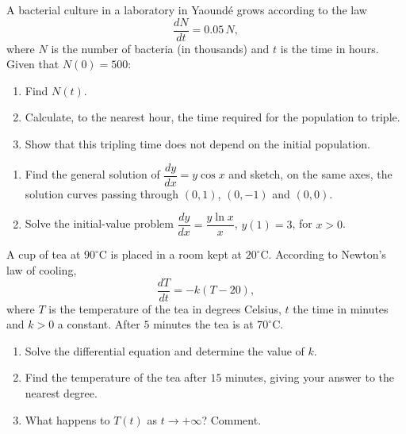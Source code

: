 \documentclass[11pt]{article}
\newcounter{popsec}
\newcounter{popsub}
\newcommand{\courssub}[1]{%
  \stepcounter{popsub}%
  \par\vspace{9pt}\noindent{\popxbold\fontsize{11.5}{13}\selectfont\color{popink}{\color{poporange}\thepopsec.\thepopsub}\hspace{6pt}#1}\par\nopagebreak\vspace{4pt}
}
\begin{document}
\begin{exercice}
A bacterial culture in a laboratory in Yaoundé grows according to the law
\[
\frac{dN}{dt}=0.05\,N,
\]
where $N$ is the number of bacteria (in thousands) and $t$ is the time in hours. Given that $N(0)=500$:
\begin{enumerate}
\item Find $N(t)$.
\item Calculate, to the nearest hour, the time required for the population to triple.
\item Show that this tripling time does not depend on the initial population.
\end{enumerate}
\end{exercice}

\begin{exercice}
\begin{enumerate}
\item Find the general solution of $\dfrac{dy}{dx}=y\cos x$ and sketch, on the same axes, the solution curves passing through $(0,1)$, $(0,-1)$ and $(0,0)$.
\item Solve the initial-value problem $\dfrac{dy}{dx}=\dfrac{y\ln x}{x}$, $y(1)=3$, for $x>0$.
\end{enumerate}
\end{exercice}

\begin{exercice}
A cup of tea at $90^{\circ}$C is placed in a room kept at $20^{\circ}$C. According to Newton's law of cooling,
\[
\frac{dT}{dt}=-k(T-20),
\]
where $T$ is the temperature of the tea in degrees Celsius, $t$ the time in minutes and $k>0$ a constant. After $5$ minutes the tea is at $70^{\circ}$C.
\begin{enumerate}
\item Solve the differential equation and determine the value of $k$.
\item Find the temperature of the tea after $15$ minutes, giving your answer to the nearest degree.
\item What happens to $T(t)$ as $t\to+\infty$? Comment.
\end{enumerate}
\end{exercice}

\courssub{I prepare for the GCE}
\end{document}

